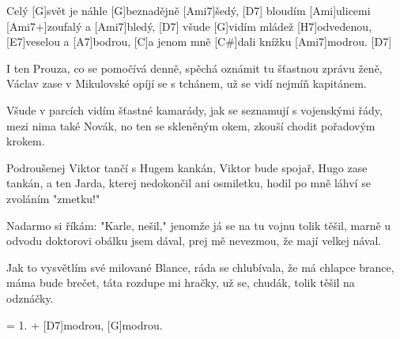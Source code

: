 
\sloka
Celý [G]svět je náhle [G]beznadějně [Ami7]šedý, [D7]
bloudím [Ami]ulicemi [Ami7+]zoufalý a [Ami7]bledý, [D7]
všude [G]vidím mládež [H7]odvedenou, [E7]veselou a [A7]bodrou,
[C]a jenom mně [C#\dim]dali knížku [Ami7]modrou. [D7]

\sloka
I ten Prouza, co se pomočívá denně,
spěchá oznámit tu šťastnou zprávu ženě,
Václav zase v Mikulovské opíjí se s tchánem,
už se vidí nejmíň kapitánem.

\sloka
Všude v parcích vidím šťastné kamarády,
jak se seznamují s vojenskými řády,
mezi nima také Novák, no ten se skleněným okem,
zkouší chodit pořadovým krokem.

\sloka
Podroušenej Viktor tančí s Hugem kankán,
Viktor bude spojař, Hugo zase tankán,
a ten Jarda, kterej nedokončil ani osmiletku,
hodil po mně láhví se zvoláním "zmetku!"

\sloka
Nadarmo si říkám: "Karle, nešil,"
jenomže já se na tu vojnu tolik těšil,
marně u odvodu doktorovi obálku jsem dával,
prej mě nevezmou, že mají velkej nával.

\sloka
Jak to vysvětlím své milované Blance,
ráda se chlubívala, že má chlapce brance,
máma bude brečet, táta rozdupe mi hračky,
už se, chudák, tolik těšil na odznáčky.

\sloka
= 1.
+ [D7]modrou, [G]modrou.
